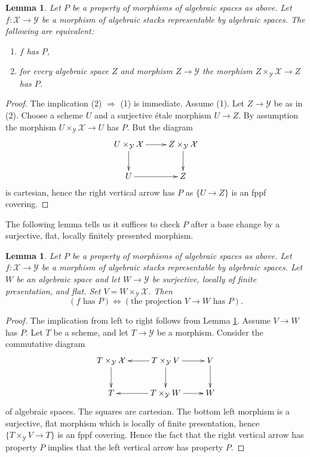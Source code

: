 \documentclass{stacks-project}
\theoremstyle{plain}
\newtheorem{lemma}[subsection]{Lemma}
\theoremstyle{definition}
\theoremstyle{remark}
\numberwithin{equation}{subsection}
\begin{document}
\begin{lemma}
\label{lemma-property-spaces-too}
Let $P$ be a property of morphisms of algebraic spaces as above.
Let $f : \mathcal{X} \to \mathcal{Y}$ be a morphism of algebraic stacks
representable by algebraic spaces. The following are equivalent:
\begin{enumerate}
\item $f$ has $P$,
\item for every algebraic space $Z$ and morphism $Z \to \mathcal{Y}$
the morphism $Z \times_\mathcal{Y} \mathcal{X} \to Z$ has $P$.
\end{enumerate}
\end{lemma}

\begin{proof}
The implication (2) $\Rightarrow$ (1) is immediate. Assume (1).
Let $Z \to \mathcal{Y}$ be as in (2). Choose a scheme $U$ and a
surjective \'etale morphism $U \to Z$. By assumption the morphism
$U \times_\mathcal{Y} \mathcal{X} \to U$ has $P$. But the diagram
$$
\xymatrix{
U \times_\mathcal{Y} \mathcal{X} \ar[d] \ar[r] &
Z \times_\mathcal{Y} \mathcal{X} \ar[d] \\
U \ar[r] & Z
}
$$
is cartesian, hence the right vertical arrow has $P$ as
$\{U \to Z\}$ is an fppf covering.
\end{proof}

\noindent
The following lemma tells us it suffices to check $P$
after a base change by a surjective, flat, locally finitely presented
morphism.

\begin{lemma}
\label{lemma-check-property-covering}
Let $P$ be a property of morphisms of algebraic spaces as above.
Let $f : \mathcal{X} \to \mathcal{Y}$ be a morphism of algebraic stacks
representable by algebraic spaces.
Let $W$ be an algebraic space and let $W \to \mathcal{Y}$ be surjective,
locally of finite presentation, and flat.
Set $V = W \times_\mathcal{Y} \mathcal{X}$. Then
$$
(f\text{ has }P) \Leftrightarrow (\text{the projection }V \to W\text{ has }P).
$$
\end{lemma}

\begin{proof}
The implication from left to right follows from
Lemma \ref{lemma-property-spaces-too}.
Assume $V \to W$ has $P$. Let $T$ be a scheme, and let
$T \to \mathcal{Y}$ be a morphism. Consider the commutative diagram
$$
\xymatrix{
T \times_\mathcal{Y} \mathcal{X} \ar[d] &
T \times_\mathcal{Y} V \ar[d] \ar[l] \ar[r] &
V \ar[d] \\
T & T \times_\mathcal{Y} W \ar[l] \ar[r] & W
}
$$
of algebraic spaces. The squares are cartesian.
The bottom left morphism is a surjective, flat morphism which is locally of
finite presentation, hence $\{T \times_\mathcal{Y} V \to T\}$ is an
fppf covering. Hence the fact that the right vertical arrow has property
$P$ implies that the left vertical arrow has property $P$.
\end{proof}
\end{document}
